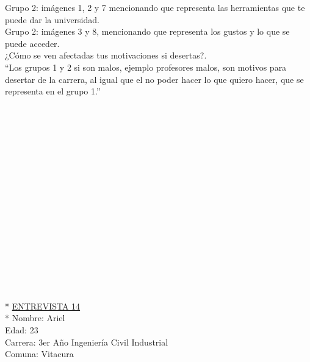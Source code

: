 Grupo 2: imágenes 1, 2 y 7 mencionando que representa las herramientas que te puede dar la universidad.\\

Grupo 2: imágenes 3 y 8, mencionando que representa los gustos y lo que se puede acceder.\\

¿Cómo se ven afectadas tus motivaciones si desertas?.\\

``Los grupos 1 y 2 si son malos, ejemplo profesores malos, son motivos para desertar de la carrera, al igual que el no poder hacer lo que quiero hacer, que se representa en el grupo 1.''\\
\\
\\
\\
\\
\\
\\
\\
\\
\\
\\
\\
\\
\\
\\
\\
\\
\\*
\underline {ENTREVISTA 14}\\*
Nombre: Ariel\\
Edad: 23\\
Carrera: 3er Año Ingeniería Civil Industrial\\
Comuna: Vitacura\\

